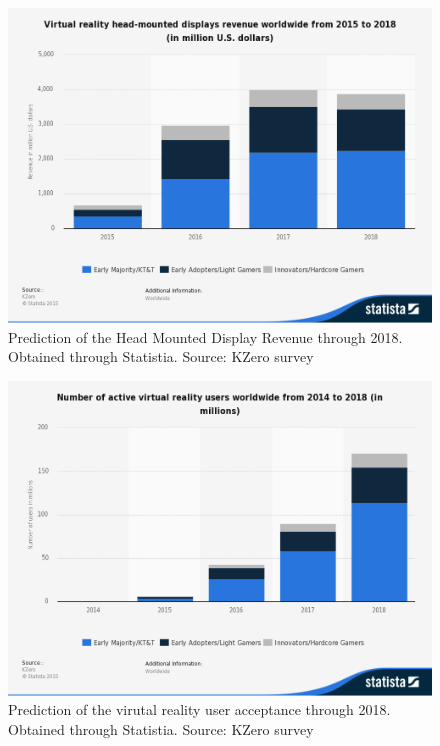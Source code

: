 \documentclass[a4paper,10pt]{article}
\begin{document}
\begin{figure}[H]
	\centerline{\includegraphics[scale = 0.3]{statMon.png}}
	\caption{Prediction of the Head Mounted Display Revenue through 2018.  Obtained through Statistia.  Source: KZero survey}
	\label{fig:moneyStats}
\end{figure}

\begin{figure}[H]
	\centerline{\includegraphics[scale = 0.25]{statsUsers.png}}
	\caption{Prediction of the virutal reality user acceptance through 2018.  Obtained through Statistia.  Source: KZero survey}
	\label{fig:userStats}
\end{figure}
\end{document}
